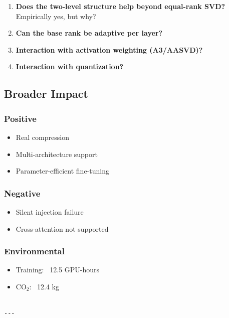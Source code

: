 \begin{enumerate}
\item \textbf{Does the two-level structure help beyond equal-rank SVD?}
  Empirically yes, but why?
\item \textbf{Can the base rank be adaptive per layer?}
\item \textbf{Interaction with activation weighting (A3/AASVD)?}
\item \textbf{Interaction with quantization?}

\end{enumerate}
\subsection{Broader Impact}

\subsubsection{Positive}
\begin{itemize}
\item Real compression
\item Multi-architecture support
\item Parameter-efficient fine-tuning

\end{itemize}
\subsubsection{Negative}
\begin{itemize}
\item Silent injection failure
\item Cross-attention not supported

\end{itemize}
\subsubsection{Environmental}
\begin{itemize}
\item Training: ~12.5 GPU-hours
\item CO$_2$: ~12.4 kg
\end{itemize}
\begin{lstlisting}

---
\end{lstlisting}